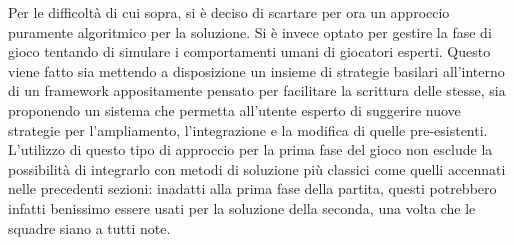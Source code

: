 Per le difficoltà di cui sopra, si è deciso di scartare per ora un approccio puramente algoritmico per la soluzione.
Si è invece optato per gestire la fase di gioco tentando di simulare i comportamenti umani di giocatori esperti.
Questo viene fatto sia mettendo a disposizione un insieme di strategie basilari all'interno di un framework appositamente pensato per facilitare la scrittura delle stesse, sia proponendo un sistema che permetta all'utente esperto di suggerire nuove strategie per l'ampliamento, l'integrazione e la modifica di quelle pre-esistenti.\\
L'utilizzo di questo tipo di approccio per la prima fase del gioco non esclude la possibilità di integrarlo con metodi di soluzione più classici come quelli accennati nelle precedenti sezioni: inadatti alla prima fase della partita, questi potrebbero infatti benissimo essere usati per la soluzione della seconda, una volta che le squadre siano a tutti note.
